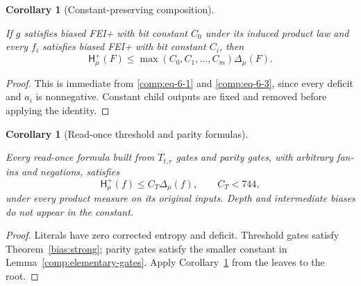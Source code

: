 \documentclass[11pt]{amsart}
\newtheorem{corollary}[theorem]{Corollary}
\theoremstyle{definition}
\theoremstyle{remark}
\newcommand{\HH}{\mathsf H}
\begin{document}
\begin{corollary}[Constant-preserving composition]\label{comp:closure}

If \(g\) satisfies biased FEI+ with bit constant \(C_0\) under its induced product law and every \(f_i\) satisfies biased FEI+ with bit constant \(C_i\), then \[
 \HH_\mu^+(F)\le\max(C_0,C_1,\ldots,C_m)\Delta_\mu(F).
\]

\end{corollary}
\begin{proof}

This is immediate from \eqref{comp:eq-6-1} and \eqref{comp:eq-6-3}, since every deficit and \(a_i\) is nonnegative. Constant child outputs are fixed and removed before applying the identity.

\end{proof}

\begin{corollary}[Read-once threshold and parity formulas]\label{comp:threshold-formulas}

Every read-once formula built from \(T_{t,r}\) gates and parity gates, with arbitrary fan-ins and negations, satisfies \[
 \HH_\mu^+(f)\le C_T\Delta_\mu(f),\qquad C_T<744,
\] under every product measure on its original inputs. Depth and intermediate biases do not appear in the constant.

\end{corollary}
\begin{proof}

Literals have zero corrected entropy and deficit. Threshold gates satisfy Theorem~\ref{bias:strong}; parity gates satisfy the smaller constant in Lemma~\ref{comp:elementary-gates}. Apply Corollary~\ref{comp:closure} from the leaves to the root.

\end{proof}
\end{document}
